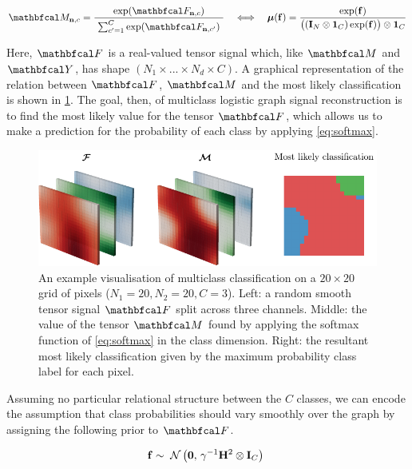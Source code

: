 \begin{equation}
    \label{eq:softmax}
    \Mt_{\nn, c} = \frac{\exp(\Ft_{\nn, c})}{ \raisebox{-0.1cm} { $\sum_{c'=1}^C \exp(\Ft_{\nn, c'})$ }}  \quad \Longleftrightarrow \quad \muu(\f) = \frac{\exp(\f)}{ \big((\I_N \otimes \one_C) \exp(\f)\big) \otimes \one_C}
\end{equation}

Here, $\Ft$ is a real-valued tensor signal which, like $\Mt$ and $\Yt$, has shape $(N_1 \times ... \times N_d \times C)$. A graphical representation of the relation between $\Ft$, $\Mt$ and the most likely classification is shown in \cref{fig:logistic_gsr_multiclass}. The goal, then, of multiclass logistic graph signal reconstruction is to find the most likely value for the tensor $\Ft$, which allows us to make a prediction for the probability of each class by applying \cref{eq:softmax}.  

\begin{figure}[t]  
    \begin{center}
        \includegraphics[width=\linewidth]{Figures/multiclass.pdf}
    \end{center}
   \caption[Visualisation of multiclass classification on a 2D lattice]{An example visualisation of multiclass classification on a $20 \times 20$ grid of pixels ($N_1 = 20, N_2 = 20, C=3$). Left: a random smooth tensor signal $\Ft$ split across three channels. Middle: the value of the tensor $\Mt$ found by applying the softmax function of \cref{eq:softmax} in the class dimension. Right: the resultant most likely classification given by the maximum probability class label for each pixel. } 
    \label{fig:logistic_gsr_multiclass}
\end{figure} 


Assuming no particular relational structure between the $C$ classes, we can encode the assumption that class probabilities should vary smoothly over the graph by assigning the following prior to $\Ft$. 

\begin{equation}
    \mathbf{f} \sim \; \mathcal{N}\left(\mathbf{0}, \, \gamma^{-1} \mathbf{H}^2 \otimes \mathbf{I}_C\right) \;
\end{equation}

